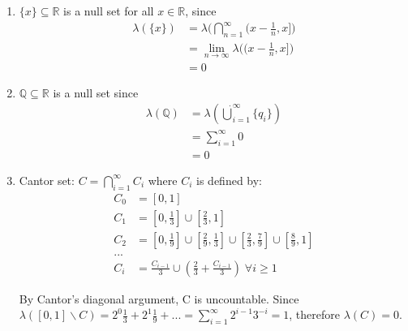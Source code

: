 \documentclass{article}
\begin{document}
	\begin{myex}{}{}
		\begin{enumerate}
			\item $\{x\}\subseteq\mathbb{R}$ is a null set for all $x\in\mathbb{R}$, since
			\begin{align*}
				\lambda(\{x\})&=\lambda\big(\bigcap_{n=1}^{\infty}(x-\frac{1}{n}, x]\big)\\
				&=\lim_{n\to\infty}\lambda\big((x-\frac{1}{n}, x]\big)\\
				&=0
			\end{align*}
			\item $\mathbb{Q}\subseteq\mathbb{R}$ is a null set since
			\begin{align*}
				\lambda(\mathbb{Q})&=\lambda(\dot\bigcup_{i=1}^{\infty}\{q_i\})\\
				&=\sum_{i=1}^{\infty}0\\
				&=0
			\end{align*}
			\item Cantor set: $C=\bigcap_{i=1}^{\infty}C_i$ where $C_i$ is defined by:
			\begin{align*}
				C_0&=[0,1]\\
				C_1&=[0,\frac{1}{3}]\cup[\frac{2}{3}, 1]\\
				C_2&=[0,\frac{1}{9}]\cup[\frac{2}{9}, \frac{1}{3}]\cup[\frac{2}{3}, \frac{7}{9}]\cup[\frac{8}{9}, 1]\\
				...\\
				C_i&=\frac{C_{i-1}}{3}\cup(\frac{2}{3}+\frac{C_{i-1}}{3})\;\forall i\geq1
			\end{align*}
			
			By Cantor's diagonal argument, C is uncountable. Since $\lambda([0, 1]\backslash C)=2^0\frac{1}{3}+2^1\frac{1}{9}+...=\sum_{i=1}^{\infty}2^{i-1}3^{-i}=1$, therefore $\lambda(C)=0$.
		\end{enumerate}
	\end{myex}
	
\end{document}

